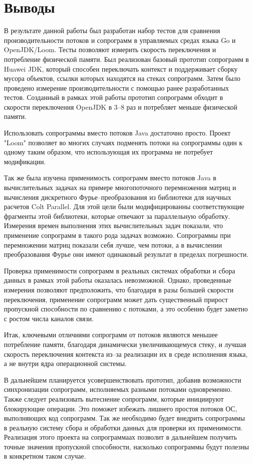 \section{Выводы}
	В результате данной работы был разработан набор тестов для сравнения производительности потоков и сопрограмм в
	управляемых средах языка Go и OpenJDK/Loom. Тесты позволяют измерить скорость переключения и
	потребление физической памяти. Был реализован базовый прототип сопрограмм в
	Huawei JDK, который способен переключать контекст и поддерживает сборку мусора объектов, ссылки которых находятся
	на стеках сопрограмм. Затем было проведено измерение производительности с помощью ранее разработанных тестов.
	Созданный в рамках этой работы прототип сопрограмм обходит в скорости переключения
	OpenJDK в 3--8 раз и потребляет меньше физической памяти.
	\par
	Использовать сопрограммы вместо потоков Java достаточно просто. Проект "Loom"
	позволяет во многих случаях подменять потоки на сопрограммы один к одному таким образом,
	что использующая их программа не потребует модификации.
	\par
	Так же была изучена применимость сопрограмм вместо потоков Java в вычислительных задачах на
	примере многопоточного перемножения матриц и вычисления дискретного Фурье--преобразования 
	из библиотеки для научных расчетов Colt Parallel. Для этой цели были модифицированны соответствующие 
	фрагменты этой библиотеки, которые отвечают за параллельную обработку.
	Измерения времен выполнения этих вычислительных задач показали, что применение сопрограмм в 
	такого рода задачах возможно. Сопрограммы при перемножении матриц показали себя лучше,
	чем потоки, а в вычислении преобразования Фурье они имеют одинаковый результат в пределах погрешности.
	\par
	Проверка применимости сопрограмм в реальных системах обработки и сбора данных в рамках
	этой работы оказалась невозможной. Однако, проведенные измерения позволяют предположить,
	что благодаря в разы большей скорости переключения, применение сопрограмм может дать 
	существенный прирост пропускной способности по сравнению с потоками, а это особенно будет заметно
	с ростом числа каналов связи. 
	\par
	Итак, ключевыми отличиями сопрограмм от потоков являются меньшее потребление памяти, благодаря
	динамически увеличивающемуся стеку, и лучшая скорость переключения контекста из--за реализации 
	их в среде исполнения языка, а не внутри ядра операционной системы.
	\par
	В дальнейшем планируется усовершенствовать прототип, добавив возможности синхронизации
	сопрограмм, исполняемых разными потоками одновременно. Также следует реализовать вытеснение сопрограмм, которые
	инициируют блокирующие операции. Это поможет избежать лишнего простоя потоков ОС, выполняющих код сопрограмм. 
	Так же необходимо будет внедрить сопрограммы в реальную систему сбора и обработки данных для проверки их 
	применимости. Реализация этого проекта на сопрограммаах позволит в дальнейшем получить точные значения
	пропускной способности, насколько сопрограммы будут полезны в конкретном таком случае.  
\clearpage
